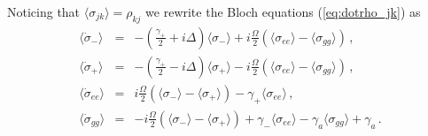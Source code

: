 \documentclass[twocolumn,aps,eqsecnum,showkeys,amsmath]{revtex4-2}
\begin{document}
Noticing that $\langle \sigma_{jk} \rangle =\rho_{kj}$ we rewrite the 
Bloch equations  (\ref{eq:dotrho_jk}) as 
%
\begin{eqnarray} 	\label{eq:dotsigma_jk}
\langle \dot{\sigma}_{-} \rangle 
&=& -\left( \frac{\gamma_+}{2} +i\Delta \right) 
	\langle \sigma_{-} \rangle 
 +i\frac{\Omega}{2} (\langle \sigma_{ee} \rangle 
 	-\langle \sigma_{gg} \rangle)	\,,  \nonumber  	\\
%
\langle \dot{\sigma}_{+} \rangle 
&=& -\left( \frac{\gamma_+}{2} -i\Delta \right) 
	\langle \sigma_{+} \rangle 
 -i\frac{\Omega}{2} (\langle \sigma_{ee} \rangle -\langle 
 	\sigma_{gg} \rangle)  \,,	\nonumber 	\\
%
\langle \dot{\sigma}_{ee} \rangle 
&=& i\frac{\Omega}{2} (\langle \sigma_{-} \rangle 
	-\langle \sigma_{+} \rangle)
 	-\gamma_+ \langle \sigma_{ee} \rangle	\,, \nonumber 	\\
%
\langle \dot{\sigma}_{gg} \rangle 
&=& -i\frac{\Omega}{2} (\langle \sigma_{-} \rangle 
	-\langle \sigma_{+} \rangle)  
	+\gamma_- \langle \sigma_{ee} \rangle  	
	 -\gamma_a \langle \sigma_{gg} \rangle  +\gamma_a \,.	
	\nonumber \\	
\end{eqnarray}
\end{document}
